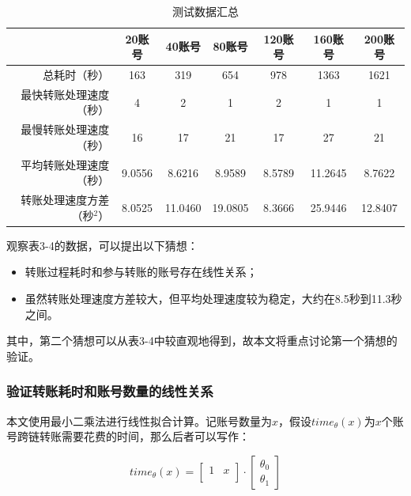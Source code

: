 \begin{table}[htbp]
    \linespread{1.5}
    \centering
    \caption{测试数据汇总}\label{测试数据汇总}
    \begin{tabular}{r|c|c|c|c|c|c} \toprule
                        & 20账号   & 40账号    & 80账号    & 120账号  & 160账号   & 200账号   \\\hline
        总耗时（秒）          & 163    & 319     & 654     & 978    & 1363    & 1621    \\
        最快转账处理速度（秒）     & 4      & 2       & 1       & 2      & 1       & 1       \\
        最慢转账处理速度（秒）     & 16     & 17      & 21      & 17     & 27      & 21      \\
        平均转账处理速度（秒）     & 9.0556 & 8.6216  & 8.9589  & 8.5789 & 11.2645 & 8.7622  \\
        转账处理速度方差（秒$^2$） & 8.0525 & 11.0460 & 19.0805 & 8.3666 & 25.9446 & 12.8407 \\
        \bottomrule
    \end{tabular}
\end{table}

观察表3-4的数据，可以提出以下猜想：
\begin{itemize}
    \item 转账过程耗时和参与转账的账号存在线性关系；
    \item 虽然转账处理速度方差较大，但平均处理速度较为稳定，大约在8.5秒到11.3秒之间。
\end{itemize}

其中，第二个猜想可以从表3-4中较直观地得到，故本文将重点讨论第一个猜想的验证。

\subsubsection{验证转账耗时和账号数量的线性关系}

本文使用最小二乘法进行线性拟合计算。记账号数量为$x$，假设$time_\theta(x)$为$x$个账号跨链转账需要花费的时间，那么后者可以写作：

$$
    time_\theta(x) =
    \begin{bmatrix}
        1 & x \\
    \end{bmatrix}
    \cdot
    \begin{bmatrix}
        \theta_0 \\
        \theta_1
    \end{bmatrix}
$$

